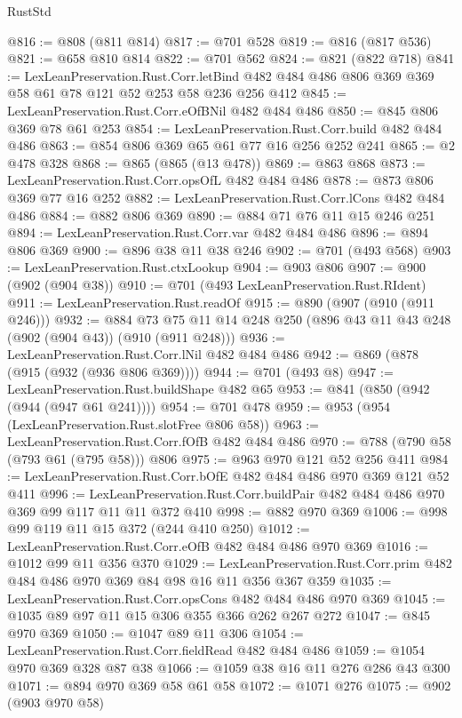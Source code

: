 \begin{lexlean}{RustStd}
\begin{coremodule}
@816 := @808 (@811 @814)
@817 := @701 @528
@819 := @816 (@817 @536)
@821 := @658 @810 @814
@822 := @701 @562
@824 := @821 (@822 @718)
@841 := LexLeanPreservation.Rust.Corr.letBind
    @482
    @484
    @486
    @806
    @369
    @369
    @58
    @61
    @78
    @121
    @52
    @253
    @58
    @236
    @256
    @412
@845 := LexLeanPreservation.Rust.Corr.eOfBNil @482 @484 @486
@850 := @845 @806 @369 @78 @61 @253
@854 := LexLeanPreservation.Rust.Corr.build @482 @484 @486
@863 := @854 @806 @369 @65 @61 @77 @16 @256 @252 @241
@865 := @2 @478 @328
@868 := @865 (@865 (@13 @478))
@869 := @863 @868
@873 := LexLeanPreservation.Rust.Corr.opsOfL @482 @484 @486
@878 := @873 @806 @369 @77 @16 @252
@882 := LexLeanPreservation.Rust.Corr.lCons @482 @484 @486
@884 := @882 @806 @369
@890 := @884 @71 @76 @11 @15 @246 @251
@894 := LexLeanPreservation.Rust.Corr.var @482 @484 @486
@896 := @894 @806 @369
@900 := @896 @38 @11 @38 @246
@902 := @701 (@493 @568)
@903 := LexLeanPreservation.Rust.ctxLookup
@904 := @903 @806
@907 := @900 (@902 (@904 @38))
@910 := @701 (@493 LexLeanPreservation.Rust.RIdent)
@911 := LexLeanPreservation.Rust.readOf
@915 := @890 (@907 (@910 (@911 @246)))
@932 := @884 @73 @75 @11 @14 @248 @250 (@896 @43 @11 @43 @248 (@902 (@904 @43)) (@910 (@911 @248)))
@936 := LexLeanPreservation.Rust.Corr.lNil @482 @484 @486
@942 := @869 (@878 (@915 (@932 (@936 @806 @369))))
@944 := @701 (@493 @8)
@947 := LexLeanPreservation.Rust.buildShape @482 @65
@953 := @841 (@850 (@942 (@944 (@947 @61 @241))))
@954 := @701 @478
@959 := @953 (@954 (LexLeanPreservation.Rust.slotFree @806 @58))
@963 := LexLeanPreservation.Rust.Corr.fOfB @482 @484 @486
@970 := @788 (@790 @58 (@793 @61 (@795 @58))) @806
@975 := @963 @970 @121 @52 @256 @411
@984 := LexLeanPreservation.Rust.Corr.bOfE @482 @484 @486 @970 @369 @121 @52 @411
@996 := LexLeanPreservation.Rust.Corr.buildPair @482 @484 @486 @970 @369 @99 @117 @11 @11 @372 @410
@998 := @882 @970 @369
@1006 := @998 @99 @119 @11 @15 @372 (@244 @410 @250)
@1012 := LexLeanPreservation.Rust.Corr.eOfB @482 @484 @486 @970 @369
@1016 := @1012 @99 @11 @356 @370
@1029 := LexLeanPreservation.Rust.Corr.prim @482 @484 @486 @970 @369 @84 @98 @16 @11 @356 @367 @359
@1035 := LexLeanPreservation.Rust.Corr.opsCons @482 @484 @486 @970 @369
@1045 := @1035 @89 @97 @11 @15 @306 @355 @366 @262 @267 @272
@1047 := @845 @970 @369
@1050 := @1047 @89 @11 @306
@1054 := LexLeanPreservation.Rust.Corr.fieldRead @482 @484 @486
@1059 := @1054 @970 @369 @328 @87 @38
@1066 := @1059 @38 @16 @11 @276 @286 @43 @300
@1071 := @894 @970 @369 @58 @61 @58
@1072 := @1071 @276
@1075 := @902 (@903 @970 @58)

\end{coremodule}
\end{lexlean}
